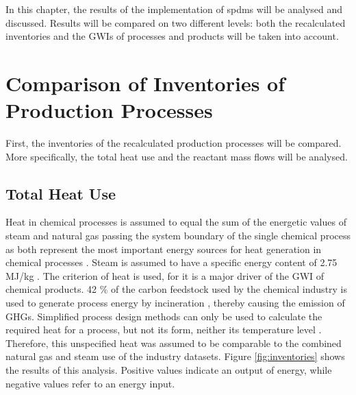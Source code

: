 \label{chap:results}
In this chapter, the results of the implementation of \aclp{spdm} will be analysed and discussed. Results will be compared on two different levels: both the recalculated inventories and the \aclp{GWI} of processes and products will be taken into account.


\section{Comparison of Inventories of Production Processes}
\label{sec:inventories}
First, the inventories of the recalculated production processes will be compared. More specifically, the total heat use and the reactant mass flows will be analysed.

\subsection{Total Heat Use}
Heat in chemical processes is assumed to equal the sum of the energetic values of steam and natural gas passing the system boundary of the single chemical process as both represent the most important energy sources for heat generation in chemical processes \cite{Boustead.1999}. Steam is assumed to have a specific energy content of 2.75 MJ/kg \cite{Althaus.2007}. The criterion of heat is used, for it is a major driver of the \acl{GWI} of chemical products. 42 \% of the carbon feedstock used by the chemical industry is used to generate process energy by incineration \cite{InternationalEnergyAgency.2017}, thereby causing the emission of \aclp{GHG}. Simplified process design methods can only be used to calculate the required heat for a process, but not its form, neither its temperature level \cite{Parvatker.2019}. Therefore, this unspecified heat was assumed to be comparable to the combined natural gas and steam use of the industry datasets. Figure \ref{fig:inventories} shows the results of this analysis. Positive values indicate an output of energy, while negative values refer to an energy input. 

